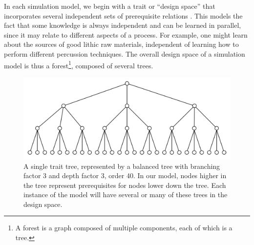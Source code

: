\documentclass[graybox,natbib]{svmult}
\begin{document}
In each simulation model, we begin with a trait or ``design space'' that
incorporates several independent sets of prerequisite relations
\citep{o2010cultural}. This models the fact that some knowledge is
always independent and can be learned in parallel, since it may relate
to different aspects of a process. For example, one might learn about
the sources of good lithic raw materials, independent of learning how to
perform different percussion techniques. The overall design space of a
simulation model is thus a forest\footnote{A forest is a graph composed
  of multiple components, each of which is a tree.}, composed of several
trees.

\begin{figure}[htbp] 
\centering 
\includegraphics[]{balanced-trait-tree-3-3.png} 
\caption{A single trait tree, represented by a balanced tree with branching factor 3 and depth factor 3, order 40.  In our model, nodes higher in the tree represent prerequisites for nodes lower down the tree.  Each instance of the model will have several or many of these trees in the design space.} 
\label{img:trait-tree} 
\end{figure}
\end{document}
